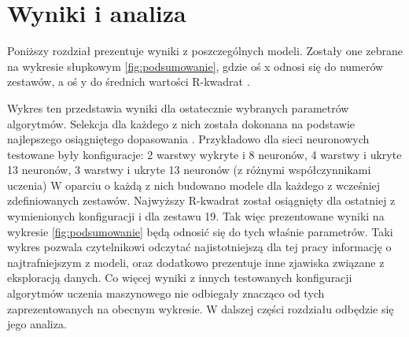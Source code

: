 \chapter{Wyniki i analiza }
Poniższy rozdział prezentuje wyniki z poszczególnych modeli. Zostały one zebrane na wykresie słupkowym \ref{fig:podsumowanie}, gdzie oś x odnosi się do numerów zestawów, a oś y do średnich wartości R-kwadrat .


 Wykres ten przedstawia wyniki dla ostatecznie wybranych parametrów algorytmów. Selekcja dla każdego z nich została dokonana na podstawie najlepszego osiągniętego dopasowania . Przykładowo dla  sieci neuronowych testowane były konfiguracje: 2 warstwy wykryte i 8 neuronów, 4 warstwy i ukryte 13 neuronów, 3 warstwy i ukryte 13 neuronów (z różnymi współczynnikami uczenia) W oparciu o każdą z nich budowano modele dla każdego z wcześniej zdefiniowanych zestawów.  Najwyższy R-kwadrat został osiągnięty dla ostatniej z wymienionych konfiguracji i dla zestawu 19. Tak więc prezentowane wyniki na wykresie  \ref{fig:podsumowanie} będą odnosić się do tych właśnie parametrów. Taki wykres pozwala czytelnikowi odczytać najistotniejszą dla tej pracy informację o najtrafniejszym z modeli, oraz dodatkowo prezentuje inne zjawiska związane z eksploracją danych. Co więcej wyniki z innych testowanych konfiguracji algorytmów uczenia maszynowego nie odbiegały znacząco od tych zaprezentowanych na obecnym wykresie. W dalszej części rozdziału  odbędzie się jego analiza.
 
    



